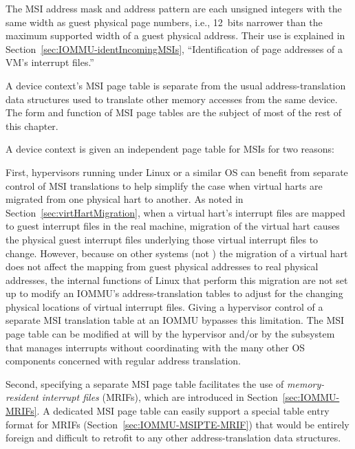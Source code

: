 The MSI address mask and address pattern are each unsigned integers
with the same width as guest physical page numbers, i.e., 12~bits
narrower than the maximum supported width of a guest physical address.
Their use is explained in Section~\ref{sec:IOMMU-identIncomingMSIs},
``Identification of page addresses of a VM's interrupt files.''

A device context's MSI page table is separate from the usual
address-translation data structures used to translate other memory
accesses from the same device.
The form and function of MSI page tables are the subject of most of the
rest of this chapter.

\begin{commentary}
A device context is given an independent page table for MSIs for two
reasons:

First, hypervisors running under Linux or a similar OS can benefit from
separate control of MSI translations to help simplify the case when
virtual harts are migrated from one physical hart to another.
As noted in Section~\ref{sec:virtHartMigration}, when a virtual
hart's interrupt files are mapped to guest interrupt files in the
real machine, migration of the virtual hart causes the physical guest
interrupt files underlying those virtual interrupt files to change.
However, because on other systems (not {\RISCV}) the migration
of a virtual hart does not affect the mapping from guest physical
addresses to real physical addresses, the internal functions of Linux
that perform this migration are not set up to modify an \mbox{IOMMU}'s
address-translation tables to adjust for the changing physical
locations of {\RISCV} virtual interrupt files.
Giving a hypervisor control of a separate MSI translation table at an
\mbox{IOMMU} bypasses this limitation.
The MSI page table can be modified at will by the hypervisor and/or
by the subsystem that manages interrupts without coordinating with the
many other OS components concerned with regular address translation.

Second, specifying a separate MSI page table facilitates the use of
\emph{memory-resident interrupt files} (MRIFs), which are introduced in
Section~\ref{sec:IOMMU-MRIFs}.
A dedicated MSI page table can easily support a special table
entry format for MRIFs (Section~\ref{sec:IOMMU-MSIPTE-MRIF}) that
would be entirely foreign and difficult to retrofit to any other
address-translation data structures.
\end{commentary}

